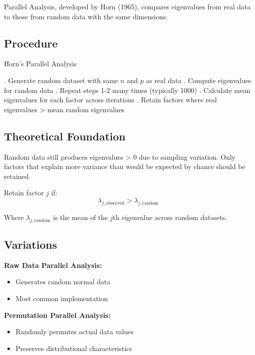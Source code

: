 \documentclass[a4paper]{tufte-book}
\begin{document}
Parallel Analysis, developed by Horn (1965), compares eigenvalues from real data to those from random data with the same dimensions.

\subsection{Procedure}

\begin{algorithm}
\caption{Horn's Parallel Analysis}
\begin{algorithmic}
. Generate random dataset with same $n$ and $p$ as real data
. Compute eigenvalues for random data
. Repeat steps 1-2 many times (typically 1000)
. Calculate mean eigenvalues for each factor across iterations
. Retain factors where real eigenvalues > mean random eigenvalues
\end{algorithmic}
\end{algorithm}

\subsection{Theoretical Foundation}

Random data still produces eigenvalues > 0 due to sampling variation. Only factors that explain more variance than would be expected by chance should be retained.

\begin{mathconcept}
Retain factor $j$ if:
$$\lambda_{j,\text{observed}} > \lambda_{j,\text{random}}$$

Where $\lambda_{j,\text{random}}$ is the mean of the $j$th eigenvalue across random datasets.
\end{mathconcept}

\subsection{Variations}

\textbf{Raw Data Parallel Analysis:}
\begin{itemize}
\item Generates random normal data
\item Most common implementation
\end{itemize}

\textbf{Permutation Parallel Analysis:}
\begin{itemize}
\item Randomly permutes actual data values
\item Preserves distributional characteristics
\end{itemize}
\end{document}

